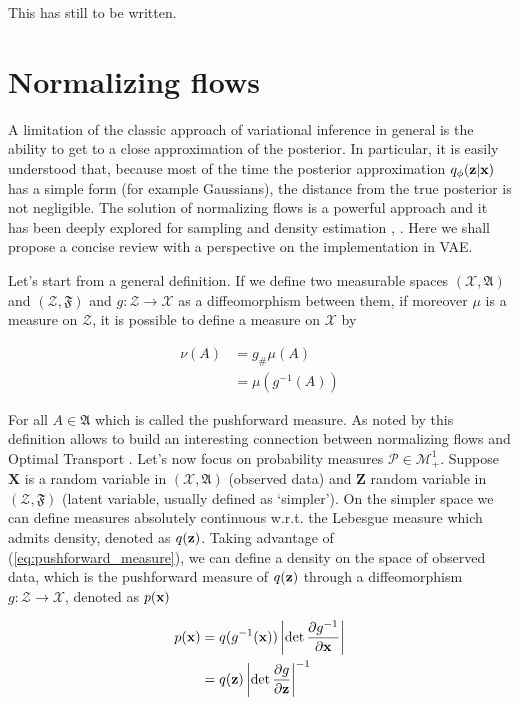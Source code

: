 \documentclass[12pt]{article}
\begin{document}
This has still to be written.

\section{Normalizing flows}
A limitation of the classic approach of variational inference in general is the ability to get to a close approximation of the posterior. In particular, it is easily understood that, because most of the time the posterior approximation \(q_\phi(\textbf{z}|\textbf{x})\) has a simple form (for example Gaussians), the distance from the true posterior is not negligible. The solution of normalizing flows is a powerful approach and it has been deeply explored for sampling and density estimation \cite{NFReview}, \cite{NFDensReview}. Here we shall propose a concise review with a perspective on the implementation in VAE.

Let's start from a general definition. If we define two measurable spaces $(\mathcal{X}, \mathfrak{A})$ and $(\mathcal{Z}, \mathfrak{F})$ and $g: \mathcal{Z} \rightarrow \mathcal{X}$ as a diffeomorphism between them, if moreover $\mu$ is a measure on $\mathcal{Z}$, it is possible to define a measure on $\mathcal{X}$ by 

\begin{align}
    \label{eq:pushforward_measure}
    \nu(A) &= g_{\#}\mu(A) \nonumber \\
    &= \mu(g^{-1}(A))
\end{align}

For all $A \in \mathfrak{A}$ which is called the pushforward measure. As noted by \cite{NFReview} this definition allows to build an interesting connection between normalizing flows and Optimal Transport \cite{villani2008optimal}. Let's now focus on probability measures $\mathcal{P} \in \mathcal{M}_+^{1}$. Suppose $\mathbf{X}$ is a random variable in $(\mathcal{X}, \mathfrak{A})$ (observed data) and $\mathbf{Z}$ random variable in $(\mathcal{Z}, \mathfrak{F})$ (latent variable, usually defined as `simpler'). On the simpler space we can define measures absolutely continuous w.r.t. the Lebesgue measure which admits density, denoted as $q(\textbf{z})$. Taking advantage of (\ref{eq:pushforward_measure}), we can define a density on the space of observed data, which is the pushforward measure of $q(\textbf{z})$ through a diffeomorphism $g: \mathcal{Z} \rightarrow \mathcal{X}$, denoted as $p(\textbf{x})$

\begin{align} 
    p(\textbf{x}) &= q(g^{-1}(\textbf{x})) \left| \det \frac{\partial g^{-1}}{\partial \textbf{x}} \right| \nonumber \\
    &= q(\textbf{z}) \left| \det \frac{\partial g}{\partial \textbf{z}} \right|^{-1}
\end{align}
\end{document}
